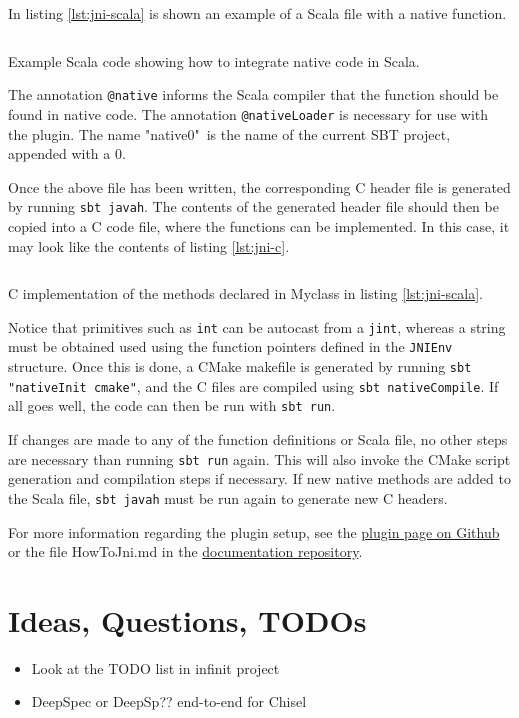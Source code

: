 \documentclass[conference]{IEEEtran}
\begin{document}
In listing \ref{lst:jni-scala} is shown an example of a Scala file with a native function.

\begin{listing}[htbp]
\inputminted{scala}{snippets/Myclass.scala}
\caption{Example Scala code showing how to integrate native code in Scala.}
\label{lst:jni-scala}
\end{listing}

The annotation \texttt{@native} informs the Scala compiler that the function should be found in native code. The annotation \texttt{@nativeLoader} is necessary for use with the plugin. The name "native0"\, is the name of the current SBT project, appended with a 0.

Once the above file has been written, the corresponding C header file is generated by running \texttt{sbt javah}. The contents of the generated header file should then be copied into a C code file, where the functions can be implemented. In this case, it may look like the contents of listing \ref{lst:jni-c}.

\begin{listing}[htbp]
\inputminted{C}{snippets/Myclass.c}
\caption{C implementation of the methods declared in Myclass in listing \ref{lst:jni-scala}.}
\label{lst:jni-c}
\end{listing}

Notice that primitives such as \texttt{int} can be autocast from a \texttt{jint}, whereas a string must be obtained used using the function pointers defined in the \texttt{JNIEnv} structure. Once this is done, a CMake makefile is generated by running \texttt{sbt "nativeInit cmake"}, and the C files are compiled using \texttt{sbt nativeCompile}. If all goes well, the code can then be run with \texttt{sbt run}. 

If changes are made to any of the function definitions or Scala file, no other steps are necessary than running \texttt{sbt run} again. This will also invoke the CMake script generation and compilation steps if necessary. If new native methods are added to the Scala file, \texttt{sbt javah} must be run again to generate new C headers.

For more information regarding the plugin setup, see the \href{https://github.com/jodersky/sbt-jni}{plugin page on Github} or the file HowToJni.md in the \href{https://github.com/chisel-uvm/documentation}{documentation repository}.





%



\section{Ideas, Questions, TODOs}



\begin{itemize}
\item Look at the TODO list in infinit project
\item DeepSpec or DeepSp?? end-to-end for Chisel
\end{itemize}
\end{document}

